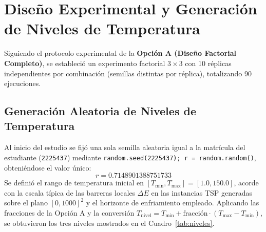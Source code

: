 \documentclass[11pt,letterpaper]{article}
\begin{document}
\begin{abstract}
En este reporte se presenta el ajuste experimental del parámetro de temperatura inicial ($T_0$) del algoritmo de Recocido Simulado (\textit{Simulated Annealing}, SA) con vecindario \textit{2-opt} aplicado al Problema del Agente Viajero (TSP) Euclidiano 2D. Se empleó la \textbf{Opción A (Diseño Factorial Completo $3 \times 3$)} tomando como factor la temperatura inicial (niveles Bajo, Medio y Alto generados aleatoriamente a partir de la matrícula \texttt{2225437}) y como bloque el tamaño del problema $n \in \{5, 10, 15\}$, con 10 réplicas independientes por punto de diseño (90 corridas en total). El análisis de varianza (ANOVA de dos factores, $\alpha = 0.05$) confirmó que tanto la temperatura ($F = 5.8979$, $p = 0.004062$), como el tamaño del problema ($F = 573.0361$, $p = 1.56 \times 10^{-48}$) y su interacción ($F = 5.7310$, $p = 0.000411$) son estadísticamente significativos. Mediante remuestreo \textit{bootstrap} no paramétrico ($B = 10{,}000$) e intervalos de confianza del 95\%, se determinó que la temperatura óptima cambia al crecer la instancia: $T_0^* = 32.9556$ (nivel \textbf{Bajo}) para $n = 5$ y $T_0^* = 77.6556$ (nivel \textbf{Medio}) para $n = 10$ y $n = 15$.
\end{abstract}

\section{\color{rojouanl} Diseño Experimental y Generación de Niveles de Temperatura}

Siguiendo el protocolo experimental de la \textbf{Opción A (Diseño Factorial Completo)}, se estableció un experimento factorial $3 \times 3$ con 10 réplicas independientes por combinación (semillas distintas por réplica), totalizando 90 ejecuciones.

\subsection{\color{cafeuanl} Generación Aleatoria de Niveles de Temperatura}
Al inicio del estudio se fijó una sola semilla aleatoria igual a la matrícula del estudiante (\texttt{2225437}) mediante \texttt{random.seed(2225437); r = random.random()}, obteniéndose el valor único:
\[
r = 0.7148901388751733
\]
Se definió el rango de temperatura inicial en $[T_{\min}, T_{\max}] = [1.0, 150.0]$, acorde con la escala típica de las barreras locales $\Delta E$ en las instancias TSP generadas sobre el plano $[0, 1000]^2$ y el horizonte de enfriamiento empleado. Aplicando las fracciones de la Opción A y la conversión $T_{\text{nivel}} = T_{\min} + \text{fracción}\cdot(T_{\max} - T_{\min})$, se obtuvieron los tres niveles mostrados en el Cuadro~\ref{tab:niveles}.
\end{document}
